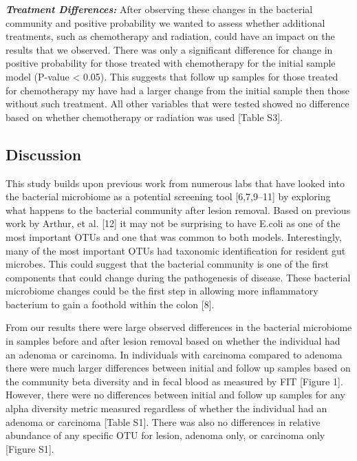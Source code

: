 \documentclass[12pt,]{article}
\begin{document}
\textbf{\emph{Treatment Differences:}} After observing these changes in
the bacterial community and positive probability we wanted to assess
whether additional treatments, such as chemotherapy and radiation, could
have an impact on the results that we observed. There was only a
significant difference for change in positive probability for those
treated with chemotherapy for the initial sample model (P-value
\textless{} 0.05). This suggests that follow up samples for those
treated for chemotherapy my have had a larger change from the initial
sample then those without such treatment. All other variables that were
tested showed no difference based on whether chemotherapy or radiation
was used {[}Table S3{]}.

\newpage

\subsection{Discussion}\label{discussion}

This study builds upon previous work from numerous labs that have looked
into the bacterial microbiome as a potential screening tool
{[}6,7,9--11{]} by exploring what happens to the bacterial community
after lesion removal. Based on previous work by Arthur, et al. {[}12{]}
it may not be surprising to have E.coli as one of the most important
OTUs and one that was common to both models. Interestingly, many of the
most important OTUs had taxonomic identification for resident gut
microbes. This could suggest that the bacterial community is one of the
first components that could change during the pathogenesis of disease.
These bacterial microbiome changes could be the first step in allowing
more inflammatory bacterium to gain a foothold within the colon {[}8{]}.

From our results there were large observed differences in the bacterial
microbiome in samples before and after lesion removal based on whether
the individual had an adenoma or carcinoma. In individuals with
carcinoma compared to adenoma there were much larger differences between
initial and follow up samples based on the community beta diversity and
in fecal blood as measured by FIT {[}Figure 1{]}. However, there were no
differences between initial and follow up samples for any alpha
diversity metric measured regardless of whether the individual had an
adenoma or carcinoma {[}Table S1{]}. There was also no differences in
relative abundance of any specific OTU for lesion, adenoma only, or
carcinoma only {[}Figure S1{]}.
\end{document}
